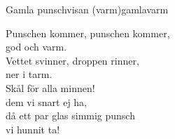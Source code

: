 \begin{song}{Gamla punschvisan (varm)}{gamlavarm}
\begin{vers}
Punschen kommer, punschen kommer,\\
god och varm.\\
Vettet svinner, droppen rinner,\\
ner i tarm.\\
Skål för alla minnen!\\
dem vi snart ej ha,\\
då ett par glas simmig punsch \\
vi hunnit ta!\\
\end{vers}
\end{song}
